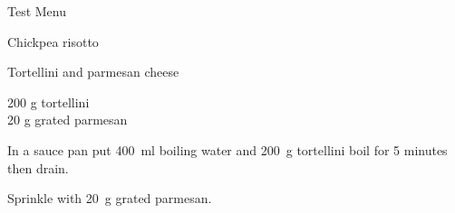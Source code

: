 \begin{menu}{Test Menu}
\begin{recipe}{2}{Chickpea risotto}
\begin{instructions}
    \end{instructions}
    \end{recipe}%
  
    \begin{recipe}{1}{Tortellini and parmesan cheese}%
    
		\begin{ingredients}
		200 g tortellini  \\
	20 g grated parmesan  \\
	
		\end{ingredients}
	
    \begin{instructions}
    \item 
      In a
      sauce pan
      put
      400~ml  boiling water
      and
      200~g  tortellini
      boil for 5 minutes then drain.
    \item 
        Sprinkle with
        20~g  grated parmesan.
      
    \end{instructions}
    \end{recipe}%
  
    \clearpage
    \end{menu}
	
